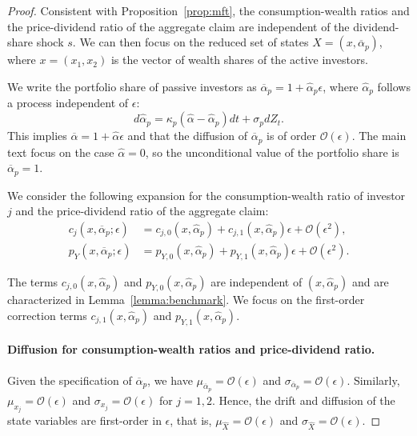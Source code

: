 \begin{proof}
Consistent with Proposition~\ref{prop:mft}, the consumption-wealth ratios and the price-dividend ratio of the aggregate claim are independent of the dividend-share shock $s$.
We can then focus on the reduced set of states $\hat{X} = (x, \overline{\alpha}_{p})$, where $x = (x_1, x_2)$ is the vector of wealth shares of the active investors.

We write the portfolio share of passive investors as $\overline{\alpha}_{p} = 1 + \hat{\alpha}_{p} \epsilon$, where $\hat{\alpha}_{p}$ follows a process independent of $\epsilon$:
\begin{equation}
    d \hat{\alpha}_{p} = \kappa_p (\hat{\alpha} - \hat{\alpha}_{p}) dt + \sigma_p dZ_t.
\end{equation}
This implies $\overline{\alpha} = 1+\hat{\alpha} \epsilon$ and that the diffusion of $\overline{\alpha}_{p}$ is of order $\mathcal{O}(\epsilon)$. The main text focus on the case $\hat{\alpha} = 0$, so the unconditional value of the portfolio share is $\overline{\alpha}_{p} = 1$.

We consider the following expansion for the consumption-wealth ratio of investor $j$ and the price-dividend ratio of the aggregate claim:
\begin{align}
    c_{j}(x, \overline{\alpha}_p;\epsilon) &= c_{j,0}(x, \hat{\alpha}_p) + c_{j,1}(x, \hat{\alpha}_p) \epsilon+\mathcal{O}(\epsilon^2),\\
    p_{Y}(x, \overline{\alpha}_p;\epsilon) &= p_{Y,0}(x, \hat{\alpha}_p) + p_{Y,1}(x, \hat{\alpha}_p) \epsilon+\mathcal{O}(\epsilon^2).
\end{align}

The terms $c_{j,0}(x, \hat{\alpha}_p)$ and $p_{Y,0}(x, \hat{\alpha}_p)$ are independent of $(x, \hat{\alpha}_p)$ and are characterized in Lemma~\ref{lemma:benchmark}.
We focus on the first-order correction terms $c_{j,1}(x, \hat{\alpha}_p)$ and $p_{Y,1}(x, \hat{\alpha}_p)$.

\paragraph{Diffusion for consumption-wealth ratios and price-dividend ratio.}
Given the specification of $\overline{\alpha}_{p}$, we have $\mu_{\overline{\alpha}_{p}} = \mathcal{O}(\epsilon)$ and $\sigma_{\overline{\alpha}_{p}} = \mathcal{O}(\epsilon)$.
Similarly, $\mu_{x_{j}} = \mathcal{O}(\epsilon)$ and $\sigma_{x_{j}} = \mathcal{O}(\epsilon)$ for $j = 1,2$.
Hence, the drift and diffusion of the state variables are first-order in $\epsilon$, that is, $\mu_{\hat{X}} = \mathcal{O}(\epsilon)$ and $\sigma_{\hat{X}} = \mathcal{O}(\epsilon)$.


\end{proof}
